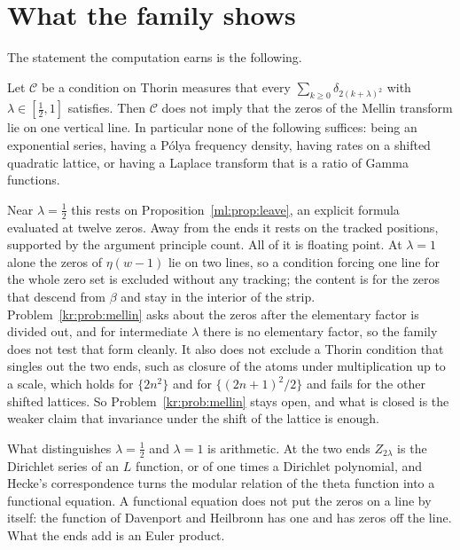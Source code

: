 \section{What the family shows}\label{ml:sec:meaning}
The statement the computation earns is the following.
\begin{proposition}\label{ml:prop:noline}
Let $\mathcal C$ be a condition on Thorin measures that every $\sum_{k\ge0}\delta_{2(k+\lambda)^2}$ with $\lambda\in[\frac12,1]$ satisfies. Then $\mathcal C$ does not imply that the zeros of the Mellin transform lie on one vertical line. In particular none of the following suffices: being an exponential series, having a P\'olya frequency density, having rates on a shifted quadratic lattice, or having a Laplace transform that is a ratio of Gamma functions.
\end{proposition}
Near $\lambda=\frac12$ this rests on Proposition~\ref{ml:prop:leave}, an explicit formula evaluated at twelve zeros. Away from the ends it rests on the tracked positions, supported by the argument principle count. All of it is floating point. At $\lambda=1$ alone the zeros of $\eta(w-1)$ lie on two lines, so a condition forcing one line for the whole zero set is excluded without any tracking; the content is for the zeros that descend from $\beta$ and stay in the interior of the strip. Problem~\ref{kr:prob:mellin} asks about the zeros after the elementary factor is divided out, and for intermediate $\lambda$ there is no elementary factor, so the family does not test that form cleanly. It also does not exclude a Thorin condition that singles out the two ends, such as closure of the atoms under multiplication up to a scale, which holds for $\{2n^2\}$ and for $\{(2n+1)^2/2\}$ and fails for the other shifted lattices. So Problem~\ref{kr:prob:mellin} stays open, and what is closed is the weaker claim that invariance under the shift of the lattice is enough.

What distinguishes $\lambda=\frac12$ and $\lambda=1$ is arithmetic. At the two ends $Z_{2\lambda}$ is the Dirichlet series of an $L$ function, or of one times a Dirichlet polynomial, and Hecke's correspondence \cite{Hecke36} turns the modular relation of the theta function into a functional equation. A functional equation does not put the zeros on a line by itself: the function of Davenport and Heilbronn \cite{DH36} has one and has zeros off the line. What the ends add is an Euler product.

